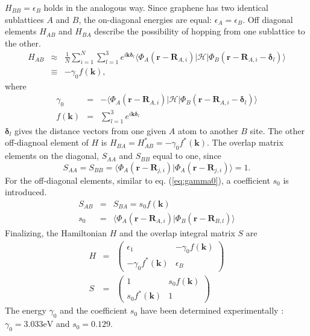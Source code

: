 $H_{B B} = \epsilon_B$ holds in the analogous way. Since graphene has two identical sublattices $A$ and $B$, the on-diagonal energies are equal: $\epsilon_A = \epsilon_B$. 
Off diagonal elements $H_{A B}$ and $H_{B A}$ describe the possibility of hopping from one sublattice to the other. 
\begin{eqnarray}
H_{A B } &\approx & \frac{1}{N} \sum_{i = 1}^N \sum_{l = 1}^3 e^{i \mathbf{k} \bm{\delta}_l} \langle \Phi_A ( \mathbf{r} - \mathbf{R}_{A, i} ) | \mathcal{H} | \Phi_B ( \mathbf{r} - \mathbf{R}_{A, i} - \bm{\delta}_l ) \rangle  \\
& \equiv & - \gamma_0 f \left( \mathbf{k} \right) \label{eq:gamma0},
\end{eqnarray}
where
\begin{eqnarray}
\gamma_0 &=& - \langle \Phi_A ( \mathbf{r} - \mathbf{R}_{A, i} )| \mathcal{H} | \Phi_B ( \mathbf{r} - \mathbf{R}_{A, i} - \bm{\delta}_l ) \rangle \\
f \left( \mathbf{k} \right) &=&  \sum_{l = 1}^3 e^{i \mathbf{k} \bm{\delta}_l} 
\end{eqnarray}
$\bm{\delta}_l$ gives the distance vectors from one given $A$ atom to another $B$ site. The other off-diagnoal element of $H$ is $H_{B A} = H_{A B}^* = - \gamma_0 f^* \left( \mathbf{k} \right)$. The overlap matrix elements on the diagonal, $S_{A A}$ and $S_{B B}$ equal to one, since 
\begin{equation}
S_{A A} = S_{B B} = \langle \Phi_A ( \mathbf{r} - \mathbf{R}_{j, i} ) | \Phi_A ( \mathbf{r} - \mathbf{R}_{j, i} ) \rangle = 1.
\end{equation}
For the off-diagonal elements, similar to eq. (\ref{eq:gamma0}), a coefficient $s_0$ is introduced.
\begin{eqnarray}
S_{A B} &=& S_{B A} = s_0 f \left( \mathbf{k} \right) \\
s_0 &=& \langle \Phi_A ( \mathbf{r} - \mathbf{R}_{A, i} ) | \Phi_B ( \mathbf{r} - \mathbf{R}_{B, l} ) \rangle 
\end{eqnarray}
Finalizing, the Hamiltonian $H$ and the overlap integral matrix $S$ are
\begin{eqnarray}
H &=& \begin{pmatrix} \epsilon_1 & - \gamma_0 f \left( \mathbf{k} \right) \\ - \gamma_0 f^* \left( \mathbf{k} \right) & \epsilon_B \end{pmatrix} \\
S &=& \begin{pmatrix} 1 & s_0 f \left( \mathbf{k} \right) \\ s_0 f^* \left( \mathbf{k} \right) & 1 \end{pmatrix}
\end{eqnarray}
The energy $\gamma_0$ and the coefficient $s_0$ have been determined experimentally \cite{Dresselhaus1995}:
$\gamma_0 = 3.033 \text{eV}$ and $s_0 = 0.129$.

